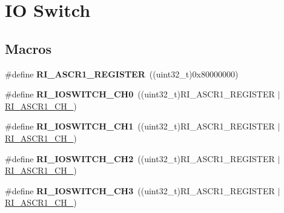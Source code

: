 \hypertarget{group___r_i___i_o_switch}{\section{I\-O Switch}
\label{group___r_i___i_o_switch}
}
\subsection*{Macros}
\begin{DoxyCompactItemize}
\item 
\hypertarget{group___r_i___i_o_switch_gaec574d20dd6b304f25344a443b2fc59a}{\#define {\bfseries R\-I\-\_\-\-A\-S\-C\-R1\-\_\-\-R\-E\-G\-I\-S\-T\-E\-R}~((uint32\-\_\-t)0x80000000)}\label{group___r_i___i_o_switch_gaec574d20dd6b304f25344a443b2fc59a}

\item 
\hypertarget{group___r_i___i_o_switch_ga1e22bbf7c7ac5c6a90b1a99f4ed3908c}{\#define {\bfseries R\-I\-\_\-\-I\-O\-S\-W\-I\-T\-C\-H\-\_\-\-C\-H0}~((uint32\-\_\-t)R\-I\-\_\-\-A\-S\-C\-R1\-\_\-\-R\-E\-G\-I\-S\-T\-E\-R $\vert$ \hyperlink{group___peripheral___registers___bits___definition_ga35c3581ed4de728efae4b8420d61b6cf}{R\-I\-\_\-\-A\-S\-C\-R1\-\_\-\-C\-H\-\_})}\label{group___r_i___i_o_switch_ga1e22bbf7c7ac5c6a90b1a99f4ed3908c}

\item 
\hypertarget{group___r_i___i_o_switch_ga39a2d3bd0d2b3dba78183f7f15f3981c}{\#define {\bfseries R\-I\-\_\-\-I\-O\-S\-W\-I\-T\-C\-H\-\_\-\-C\-H1}~((uint32\-\_\-t)R\-I\-\_\-\-A\-S\-C\-R1\-\_\-\-R\-E\-G\-I\-S\-T\-E\-R $\vert$ \hyperlink{group___peripheral___registers___bits___definition_ga476a30055082cb6239183609c321ed84}{R\-I\-\_\-\-A\-S\-C\-R1\-\_\-\-C\-H\-\_})}\label{group___r_i___i_o_switch_ga39a2d3bd0d2b3dba78183f7f15f3981c}

\item 
\hypertarget{group___r_i___i_o_switch_gaf579d0a5349473de9274854ff2268409}{\#define {\bfseries R\-I\-\_\-\-I\-O\-S\-W\-I\-T\-C\-H\-\_\-\-C\-H2}~((uint32\-\_\-t)R\-I\-\_\-\-A\-S\-C\-R1\-\_\-\-R\-E\-G\-I\-S\-T\-E\-R $\vert$ \hyperlink{group___peripheral___registers___bits___definition_gac3837d2221490cdbe32aa73ecccb81d6}{R\-I\-\_\-\-A\-S\-C\-R1\-\_\-\-C\-H\-\_})}\label{group___r_i___i_o_switch_gaf579d0a5349473de9274854ff2268409}

\item 
\hypertarget{group___r_i___i_o_switch_ga69e1edda4e512ad0e4cd41df87e2d1e8}{\#define {\bfseries R\-I\-\_\-\-I\-O\-S\-W\-I\-T\-C\-H\-\_\-\-C\-H3}~((uint32\-\_\-t)R\-I\-\_\-\-A\-S\-C\-R1\-\_\-\-R\-E\-G\-I\-S\-T\-E\-R $\vert$ \hyperlink{group___peripheral___registers___bits___definition_ga39a1b76b597db291f342168ca86c592a}{R\-I\-\_\-\-A\-S\-C\-R1\-\_\-\-C\-H\-\_})}\label{group___r_i___i_o_switch_ga69e1edda4e512ad0e4cd41df87e2d1e8}


\end{DoxyCompactItemize}

